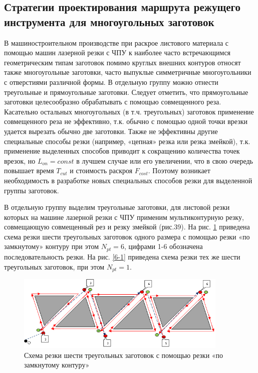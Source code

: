 \documentclass[12pt]{report}
\begin{document}
\subsection{Стратегии проектирования маршрута режущего инструмента для многоугольных заготовок}

В машиностроительном производстве
при раскрое листового материала с помощью машин лазерной резки с ЧПУ
к наиболее часто встречающимся геометрическим
типам заготовок помимо круглых внешних контуров
относят также многоугольные заготовки,
часто выпуклые симметричные многоугольники с отверстиями различной формы.
В отдельную группу можно отнести треугольные и прямоугольные заготовки.
Следует отметить, что прямоугольные заготовки целесообразно обрабатывать
с помощью совмещенного реза.
Касательно остальных многоугольных (в т.ч. треугольных)
заготовок применение совмещенного реза не эффективно,
т.к. обычно с помощью одной точки врезки удается вырезать обычно две заготовки.
Также не эффективны другие специальные способы резки
(например, «цепная» резка или резка змейкой),
т.к. применение выделенных способов приводит к
сокращению количества точек врезок,
но
$L_{on}=const$
в лучшем случае или его увеличении,
что в свою очередь повышает время
$T_{cut}$
и стоимость раскроя
$F_{cost}$.
Поэтому возникает необходимость в разработке
новых специальных способов резки для выделенной группы заготовок.

В отдельную группу выделим треугольные заготовки,
для листовой резки которых на машине лазерной резки с ЧПУ
применим мультиконтурную резку,
совмещающую совмещенный рез и резку змейкой (рис.39).
На рис. \ref{6-6} приведена схема резки шести треугольных заготовок
одного размера с помощью резки «по замкнутому» контуру при этом
$N_{pt}=6$,
цифрами 1-6 обозначена последовательность резки.
На рис. \ref{6-1} приведена схема резки тех же шести
треугольных заготовок, при этом
$N_{pt}=1$.

\begin{figure}
  \begin{center}
  \includegraphics[width=0.9\textwidth]{6-6.png}
  \caption{Схема резки шести треугольных заготовок с помощью резки «по замкнутому контуру»}
  \label{6-6}
  \end{center}
\end{figure}
\end{document}
